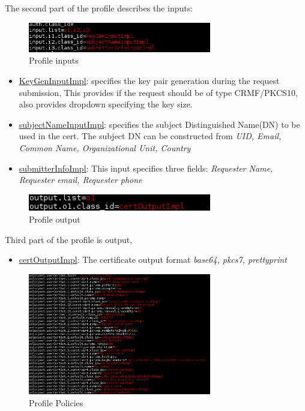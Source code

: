 \documentclass[a4paper]{article}
\begin{document}
\begin{itemize}
            The second part of the profile describes the inputs:
            \begin{figure}[ht!]
                \centering
                \includegraphics[width=80mm]{profile-2.png}
                \caption{Profile inputs}
            \end{figure}
            \begin{itemize}
                \item \underline{KeyGenInputImpl}: specifies the key pair generation during the request submission, This provides if the request
                    should be of type CRMF/PKCS10, also provides dropdown specifying the key size.
                \item \underline{subjectNameInputImpl}: specifies the subject Distinguished Name(DN) to be used in the cert. The subject DN 
                    can be constructed from \textit{UID, Email, Common Name, Organizational Unit, Country}
                \item \underline{submitterInfoImpl}: This input specifies three fields: \textit{Requester Name, Requester email, Requester phone}
            \end{itemize}
            \begin{figure}[ht!]
                \centering
                \includegraphics[width=80mm]{profile-3.png}
                \caption{Profile output}
            \end{figure}
            Third part of the profile is output, 
            \begin{itemize}
                \item \underline{certOutputImpl}: The certificate output format \textit{base64, pkcs7, prettyprint}
            \end{itemize}
            \begin{figure}[ht!]
                \centering
                \includegraphics[width=80mm]{profile-4.png}
                \caption{Profile Policies}
            \end{figure}


\end{itemize}
\end{document}
